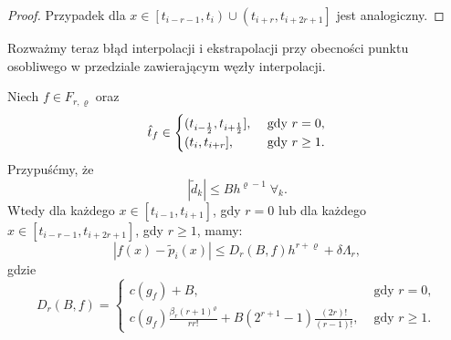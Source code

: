 \documentclass[oik, pdftex, man]{mgrwms}
\begin{document}
\begin{proof}
        \noindent
        Przypadek dla $x \in \left[ t_{i-r-1}, t_{i} \right) \cup \left( t_{i+r}, t_{i+2r+1} \right]$ jest analogiczny.
    \end{proof}

    Rozważmy teraz błąd interpolacji i ekstrapolacji przy obecności punktu osobliwego w przedziale zawierającym węzły interpolacji.

    \begin{lemma} \label{lem:algMP_3}
        Niech $f \in F_{r, \varrho}$ oraz 
        \begin{equation*}
            \hat{t}_{f} \in \begin{cases}
                (t_{i-\frac{1}{2}}, t_{i + \frac{1}{2}}],    &\text{ gdy } r=0, \\
                (t_{i}, t_{i + r}],                          &\text{ gdy } r \geq 1. \\
            \end{cases}
        \end{equation*}
        Przypuśćmy, że 
        \begin{equation} \label{eq:2}
            |\tilde{d}_{k}| \leq Bh^{\varrho-1} \; \forall_{k}.
        \end{equation}
        Wtedy dla każdego $x \in [t_{i-1}, t_{i+1}]$, gdy $r=0$ lub dla każdego $x \in [t_{i-r-1}, t_{i+2r+1}]$, gdy $r \geq 1$, mamy:
        \begin{equation*}
            |f(x) - \tilde{p}_{i}(x)| \leq D_{r}(B, f)h^{r+\varrho} + \delta\Lambda_{r},
        \end{equation*}
        gdzie 
        \begin{equation*}
            D_{r}(B, f)=\begin{cases} 
                c(g_{f}) + B,   &\text { gdy } r = 0, \\
                c(g_{f}) \frac{\beta_{r}(r+1)^{\varrho}}{r r !}+B\left(2^{r+1}-1\right) \frac{(2 r) !}{(r-1) !},    &\text { gdy } r \geq 1.
            \end{cases}
        \end{equation*}
    \end{lemma}
\end{document}
